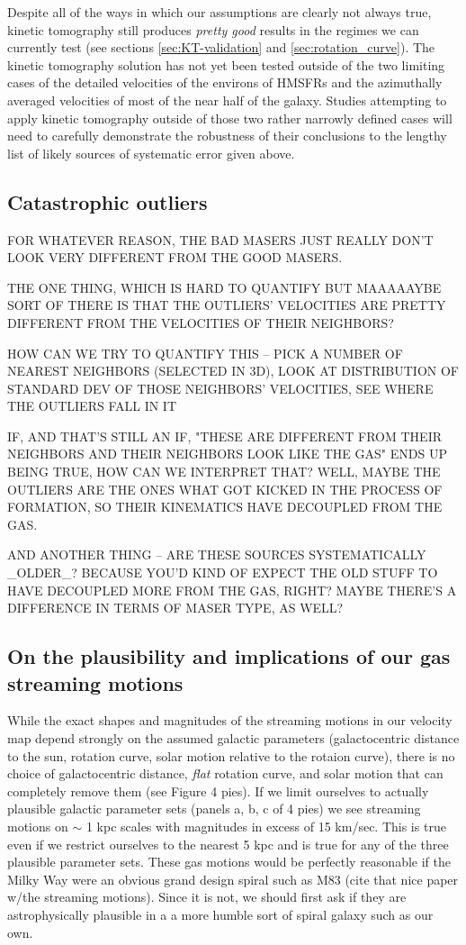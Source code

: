 Despite all of the ways in which our assumptions are clearly not always true, kinetic tomography still produces \emph{pretty good} results in the regimes we can currently test (see sections \ref{sec:KT-validation} and \ref{sec:rotation_curve}). 
The kinetic tomography solution has not yet been tested outside of the two limiting cases of the detailed velocities of the environs of HMSFRs and the azimuthally averaged velocities of most of the near half of the galaxy.
Studies attempting to apply kinetic tomography outside of those two rather narrowly defined cases will need to carefully demonstrate the robustness of their conclusions to the lengthy list of likely sources of systematic error given above.

\subsection{Catastrophic outliers}
\label{sec:discussion-catastrophic}
FOR WHATEVER REASON, THE BAD MASERS JUST REALLY DON'T LOOK VERY DIFFERENT FROM THE GOOD MASERS. 

THE ONE THING, WHICH IS HARD TO QUANTIFY BUT MAAAAAYBE SORT OF THERE IS THAT THE OUTLIERS' VELOCITIES ARE PRETTY DIFFERENT FROM THE VELOCITIES OF THEIR NEIGHBORS? 

HOW CAN WE TRY TO QUANTIFY THIS -- PICK A NUMBER OF NEAREST NEIGHBORS (SELECTED IN 3D), LOOK AT DISTRIBUTION OF STANDARD DEV OF THOSE NEIGHBORS' VELOCITIES, SEE WHERE THE OUTLIERS FALL IN IT

IF, AND THAT'S STILL AN IF, "THESE ARE DIFFERENT FROM THEIR NEIGHBORS AND THEIR NEIGHBORS LOOK LIKE THE GAS" ENDS UP BEING TRUE, HOW CAN WE INTERPRET THAT? WELL, MAYBE THE OUTLIERS ARE THE ONES WHAT GOT KICKED IN THE PROCESS OF FORMATION, SO THEIR KINEMATICS HAVE DECOUPLED FROM THE GAS.

AND ANOTHER THING -- ARE THESE SOURCES SYSTEMATICALLY _OLDER_? BECAUSE YOU'D KIND OF EXPECT THE OLD STUFF TO HAVE DECOUPLED MORE FROM THE GAS, RIGHT? MAYBE THERE'S A DIFFERENCE IN TERMS OF MASER TYPE, AS WELL?

\subsection{On the plausibility and implications of our gas streaming motions}
While the exact shapes and magnitudes of the streaming motions in our velocity map depend strongly on the assumed galactic parameters (galactocentric distance to the sun, rotation curve, solar motion relative to the rotaion curve), there is no choice of galactocentric distance, \emph{flat} rotation curve, and solar motion that can completely remove them (see Figure 4 pies).
If we limit ourselves to actually plausible galactic parameter sets (panels a, b, c of 4 pies) we see streaming motions on $\sim$ 1 kpc scales with magnitudes in excess of 15 km/sec. 
This is true even if we restrict ourselves to the nearest 5 kpc and is true for any of the three plausible parameter sets. 
These gas motions would be perfectly reasonable if the Milky Way were an obvious grand design spiral such as M83 (cite that nice paper w/the streaming motions). 
Since it is not, we should first ask if they are astrophysically plausible in a a more humble sort of spiral galaxy such as our own. 

